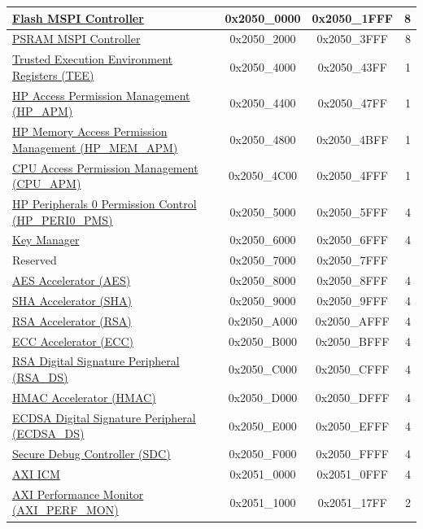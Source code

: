 \begin{ThreePartTable}
\begin{longtable}[c]{ |p{7cm}|c|c|r| }
    \hyperref[mod:spi]{Flash MSPI Controller} & 0x2050\_0000 & 0x2050\_1FFF &   8\\\hline
    \hyperref[mod:spi]{PSRAM MSPI Controller} & 0x2050\_2000 & 0x2050\_3FFF &   8\\\hline
    \hyperref[mod:permctrl]{Trusted Execution Environment Registers (TEE)} & 0x2050\_4000 & 0x2050\_43FF &   1\\\hline
    \hyperref[mod:permctrl]{HP Access Permission Management (HP\_APM)} & 0x2050\_4400 & 0x2050\_47FF &   1\\\hline
    \hyperref[mod:permctrl]{HP Memory Access Permission Management (HP\_MEM\_APM)} & 0x2050\_4800 & 0x2050\_4BFF &   1\\\hline
    \hyperref[mod:permctrl]{CPU Access Permission Management (CPU\_APM)} & 0x2050\_4C00 & 0x2050\_4FFF &   1\\\hline
    \hyperref[mod:permctrl]{HP Peripherals 0 Permission Control (HP\_PERI0\_PMS)} & 0x2050\_5000 & 0x2050\_5FFF &   4\\\hline
    \hyperref[mod:keymng]{Key Manager}    & 0x2050\_6000 & 0x2050\_6FFF &   4\\\hline
        \rowcolor{gray!25}  Reserved        & 0x2050\_7000 & 0x2050\_7FFF &    \\\hline
    \hyperref[mod:aes]{AES Accelerator (AES)} & 0x2050\_8000 & 0x2050\_8FFF &   4\\\hline
    \hyperref[mod:sha]{SHA Accelerator (SHA)} & 0x2050\_9000 & 0x2050\_9FFF &   4\\\hline
    \hyperref[mod:rsa]{RSA Accelerator (RSA)} & 0x2050\_A000 & 0x2050\_AFFF &   4\\\hline
    \hyperref[mod:ecc]{ECC Accelerator (ECC)} & 0x2050\_B000 & 0x2050\_BFFF &   4\\\hline
    \hyperref[mod:rsads]{RSA Digital Signature Peripheral (RSA\_DS)} & 0x2050\_C000 & 0x2050\_CFFF &   4\\\hline
    \hyperref[mod:hmac]{HMAC Accelerator (HMAC)} & 0x2050\_D000 & 0x2050\_DFFF &   4\\\hline
    \hyperref[mod:ecdsa]{ECDSA Digital Signature Peripheral (ECDSA\_DS)} & 0x2050\_E000 & 0x2050\_EFFF &   4\\\hline
    \hyperref[mod:sdc]{Secure Debug Controller (SDC)} & 0x2050\_F000 & 0x2050\_FFFF &   4\\\hline
    \hyperref[mod:sysreg]{AXI ICM}                          & 0x2051\_0000 & 0x2051\_0FFF &   4\\\hline
    \hyperref[mod:aximon]{AXI Performance Monitor (AXI\_PERF\_MON)} & 0x2051\_1000 & 0x2051\_17FF &   2\\\hline

\end{longtable}
\end{ThreePartTable}
